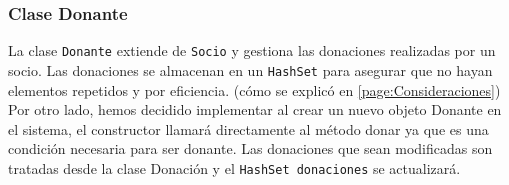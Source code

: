 


\subsubsection{Clase Donante}\label{codigo:donante}
La clase \texttt{Donante} extiende de \texttt{Socio} y gestiona las donaciones realizadas 
por un socio. Las donaciones se almacenan en un \texttt{HashSet} para asegurar que no hayan elementos repetidos y por eficiencia. (cómo se explicó en \ref{page:Consideraciones}) 
Por otro lado, hemos decidido implementar al crear un nuevo objeto Donante en el sistema,
el constructor llamará directamente al método donar ya que es una condición necesaria para ser donante. Las donaciones que sean modificadas son tratadas desde la clase Donación y
el \texttt{HashSet donaciones} se actualizará.


